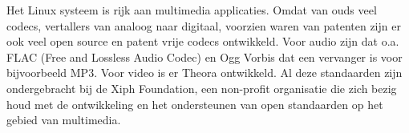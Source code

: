 Het Linux systeem is rijk aan multimedia applicaties. Omdat van ouds veel codecs, vertallers van analoog naar digitaal, voorzien waren van patenten zijn er ook veel open source en patent vrije codecs ontwikkeld. Voor audio zijn dat o.a. FLAC (Free and Lossless Audio Codec) en Ogg Vorbis dat een vervanger is voor bijvoorbeeld MP3. Voor video is er Theora ontwikkeld. Al deze standaarden zijn ondergebracht bij de Xiph Foundation, een non-profit organisatie die zich bezig houd met de ontwikkeling en het ondersteunen van open standaarden op het gebied van multimedia.

